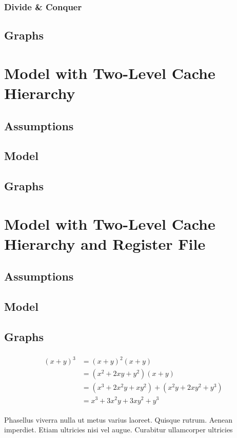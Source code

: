 \documentclass[paper=a4, fontsize=11pt]{scrartcl} %
\numberwithin{equation}{section} %
\numberwithin{figure}{section} %
\numberwithin{table}{section} %
\begin{document}
\subsubsection{Divide \& Conquer}

\subsection{Graphs}
\section{Model with Two-Level Cache Hierarchy}
\subsection{Assumptions}
\subsection{Model}
\subsection{Graphs}
\section{Model with Two-Level Cache Hierarchy and Register File}
\subsection{Assumptions}
\subsection{Model}
\subsection{Graphs}

\begin{align} 
\begin{split}
(x+y)^3 	&= (x+y)^2(x+y)\\
&=(x^2+2xy+y^2)(x+y)\\
&=(x^3+2x^2y+xy^2) + (x^2y+2xy^2+y^3)\\
&=x^3+3x^2y+3xy^2+y^3
\end{split}					
\end{align}

Phasellus viverra nulla ut metus varius laoreet. Quisque rutrum. Aenean imperdiet. Etiam ultricies nisi vel augue. Curabitur ullamcorper ultricies
\end{document}
